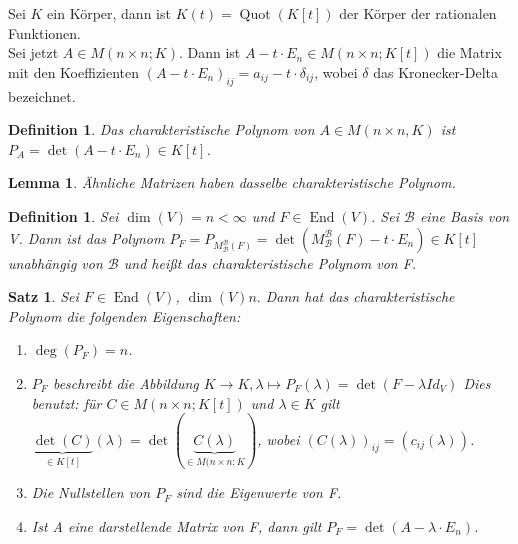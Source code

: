 \documentclass[12pt,a4paper]{article}
\theoremstyle{plain}
\newtheorem{Satz}[Theorem]{Satz}
\newtheorem{Lemma}[Theorem]{Lemma}
\newtheorem{Definition}[Theorem]{Definition}
\numberwithin{equation}{section}
\begin{document}
Sei $K$ ein K\"orper, dann ist $K(t)=\operatorname{Quot}(K[t])$ der K\"orper der rationalen Funktionen. \\
Sei jetzt $A\in M(n\times n;K)$. Dann ist $A-t\cdot E_n\in M(n\times n;K[t])$ die Matrix mit den Koeffizienten $(A-t\cdot E_n)_{ij}=a_{ij}-t\cdot \delta_{ij}$, wobei $\delta$ das Kronecker-Delta bezeichnet.
\begin{Definition}
Das charakteristische Polynom von $A\in M(n\times n,K)$ ist $P_A=\det(A-t\cdot E_n) \in K[t]$.
\end{Definition}
\begin{Lemma}
\"Ahnliche Matrizen haben dasselbe charakteristische Polynom.
\end{Lemma}
\begin{Definition}
Sei $\dim(V)=n<\infty$ und $F\in \operatorname{End}(V)$. Sei $\mathcal{B}$ eine Basis von V. Dann ist das Polynom $P_F=P_{M^\mathcal{B}_\mathcal{B}(F)}=\det(M^\mathcal{B}_\mathcal{B}(F)-t\cdot E_n)\in K[t]$ unabh\"angig von $\mathcal{B}$ und heißt das charakteristische Polynom von F.
\end{Definition}
\begin{Satz}
Sei $F\in \operatorname{End}(V)$, $\dim(V)n.$ Dann hat das charakteristische Polynom die folgenden Eigenschaften:
\begin{enumerate}
\renewcommand{\labelenumi}{\emph{\arabic{enumi})}}
\item $\deg(P_F)=n$.
\item $P_F$ beschreibt die Abbildung $K\rightarrow K, \lambda \mapsto P_F(\lambda)=\det(F-\lambda Id_V)$ Dies benutzt: für $C\in M(n\times n; K[t])$ und $\lambda \in K$ gilt $\underbrace{\det(C)}_{\in K[t]}(\lambda) = \det(\underbrace{C(\lambda)}_{\in M(n\times n;K})$, wobei $(C(\lambda))_{ij}=(c_{ij}(\lambda))$.
\item Die Nullstellen von $P_F$ sind die Eigenwerte von F.
\item Ist A eine darstellende Matrix von F, dann gilt $P_F=\det(A-\lambda\cdot E_n)$.
\end{enumerate}
\end{Satz}
\end{document}
